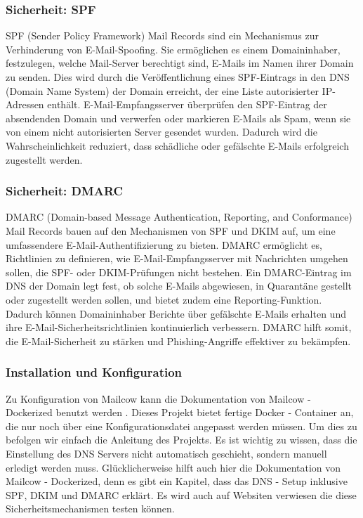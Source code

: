 \subsubsection{Sicherheit: SPF}
SPF (Sender Policy Framework) Mail Records sind ein Mechanismus zur Verhinderung von E-Mail-Spoofing. Sie 
ermöglichen es einem Domaininhaber, festzulegen, welche Mail-Server berechtigt sind, E-Mails im Namen ihrer 
Domain zu senden. Dies wird durch die Veröffentlichung eines SPF-Eintrags in den DNS (Domain Name System) der 
Domain erreicht, der eine Liste autorisierter IP-Adressen enthält. E-Mail-Empfangsserver überprüfen den 
SPF-Eintrag der absendenden Domain und verwerfen oder markieren E-Mails als Spam, wenn sie von einem nicht 
autorisierten Server gesendet wurden. Dadurch wird die Wahrscheinlichkeit reduziert, dass schädliche oder 
gefälschte E-Mails erfolgreich zugestellt werden. 

\subsubsection{Sicherheit: DMARC}
DMARC (Domain-based Message Authentication, Reporting, and Conformance) Mail Records bauen auf den Mechanismen 
von SPF und DKIM auf, um eine umfassendere E-Mail-Authentifizierung zu bieten. DMARC ermöglicht es, 
Richtlinien zu definieren, wie E-Mail-Empfangsserver mit Nachrichten umgehen sollen, die SPF- oder DKIM-Prüfungen
nicht bestehen. Ein DMARC-Eintrag im DNS der Domain legt fest, ob solche E-Mails abgewiesen, in Quarantäne gestellt
oder zugestellt werden sollen, und bietet zudem eine Reporting-Funktion. Dadurch können Domaininhaber Berichte 
über gefälschte E-Mails erhalten und ihre E-Mail-Sicherheitsrichtlinien kontinuierlich verbessern. DMARC hilft 
somit, die E-Mail-Sicherheit zu stärken und Phishing-Angriffe effektiver zu bekämpfen.

\subsubsection{Installation und Konfiguration}
Zu Konfiguration von Mailcow kann die Dokumentation von Mailcow - Dockerized benutzt werden
\cite{mailcowDockerizedDNS}. Dieses Projekt bietet fertige Docker - Container an, die nur noch über eine 
Konfigurationsdatei angepasst werden müssen. Um dies zu befolgen wir einfach die Anleitung des Projekts. Es 
ist wichtig zu wissen, dass die Einstellung des DNS Servers nicht automatisch geschieht, sondern manuell erledigt
werden muss. Glücklicherweise hilft auch hier die Dokumentation von Mailcow - Dockerized, denn es gibt ein Kapitel,
dass das DNS - Setup inklusive SPF, DKIM und DMARC erklärt. Es wird auch auf Websiten verwiesen die diese 
Sicherheitsmechanismen testen können.

